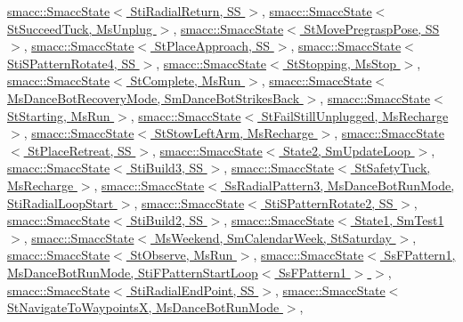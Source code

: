 \hyperlink{classsmacc_1_1SmaccState_afc39f8e0ca4001b2159a100da2fccd0e}{smacc\+::\+Smacc\+State$<$ Sti\+Radial\+Return, S\+S $>$}, \hyperlink{classsmacc_1_1SmaccState_afc39f8e0ca4001b2159a100da2fccd0e}{smacc\+::\+Smacc\+State$<$ St\+Succeed\+Tuck, Ms\+Unplug $>$}, \hyperlink{classsmacc_1_1SmaccState_afc39f8e0ca4001b2159a100da2fccd0e}{smacc\+::\+Smacc\+State$<$ St\+Move\+Pregrasp\+Pose, S\+S $>$}, \hyperlink{classsmacc_1_1SmaccState_afc39f8e0ca4001b2159a100da2fccd0e}{smacc\+::\+Smacc\+State$<$ St\+Place\+Approach, S\+S $>$}, \hyperlink{classsmacc_1_1SmaccState_afc39f8e0ca4001b2159a100da2fccd0e}{smacc\+::\+Smacc\+State$<$ Sti\+S\+Pattern\+Rotate4, S\+S $>$}, \hyperlink{classsmacc_1_1SmaccState_afc39f8e0ca4001b2159a100da2fccd0e}{smacc\+::\+Smacc\+State$<$ St\+Stopping, Ms\+Stop $>$}, \hyperlink{classsmacc_1_1SmaccState_afc39f8e0ca4001b2159a100da2fccd0e}{smacc\+::\+Smacc\+State$<$ St\+Complete, Ms\+Run $>$}, \hyperlink{classsmacc_1_1SmaccState_afc39f8e0ca4001b2159a100da2fccd0e}{smacc\+::\+Smacc\+State$<$ Ms\+Dance\+Bot\+Recovery\+Mode, Sm\+Dance\+Bot\+Strikes\+Back $>$}, \hyperlink{classsmacc_1_1SmaccState_afc39f8e0ca4001b2159a100da2fccd0e}{smacc\+::\+Smacc\+State$<$ St\+Starting, Ms\+Run $>$}, \hyperlink{classsmacc_1_1SmaccState_afc39f8e0ca4001b2159a100da2fccd0e}{smacc\+::\+Smacc\+State$<$ St\+Fail\+Still\+Unplugged, Ms\+Recharge $>$}, \hyperlink{classsmacc_1_1SmaccState_afc39f8e0ca4001b2159a100da2fccd0e}{smacc\+::\+Smacc\+State$<$ St\+Stow\+Left\+Arm, Ms\+Recharge $>$}, \hyperlink{classsmacc_1_1SmaccState_afc39f8e0ca4001b2159a100da2fccd0e}{smacc\+::\+Smacc\+State$<$ St\+Place\+Retreat, S\+S $>$}, \hyperlink{classsmacc_1_1SmaccState_afc39f8e0ca4001b2159a100da2fccd0e}{smacc\+::\+Smacc\+State$<$ State2, Sm\+Update\+Loop $>$}, \hyperlink{classsmacc_1_1SmaccState_afc39f8e0ca4001b2159a100da2fccd0e}{smacc\+::\+Smacc\+State$<$ Sti\+Build3, S\+S $>$}, \hyperlink{classsmacc_1_1SmaccState_afc39f8e0ca4001b2159a100da2fccd0e}{smacc\+::\+Smacc\+State$<$ St\+Safety\+Tuck, Ms\+Recharge $>$}, \hyperlink{classsmacc_1_1SmaccState_afc39f8e0ca4001b2159a100da2fccd0e}{smacc\+::\+Smacc\+State$<$ Ss\+Radial\+Pattern3, Ms\+Dance\+Bot\+Run\+Mode, Sti\+Radial\+Loop\+Start $>$}, \hyperlink{classsmacc_1_1SmaccState_afc39f8e0ca4001b2159a100da2fccd0e}{smacc\+::\+Smacc\+State$<$ Sti\+S\+Pattern\+Rotate2, S\+S $>$}, \hyperlink{classsmacc_1_1SmaccState_afc39f8e0ca4001b2159a100da2fccd0e}{smacc\+::\+Smacc\+State$<$ Sti\+Build2, S\+S $>$}, \hyperlink{classsmacc_1_1SmaccState_afc39f8e0ca4001b2159a100da2fccd0e}{smacc\+::\+Smacc\+State$<$ State1, Sm\+Test1 $>$}, \hyperlink{classsmacc_1_1SmaccState_afc39f8e0ca4001b2159a100da2fccd0e}{smacc\+::\+Smacc\+State$<$ Ms\+Weekend, Sm\+Calendar\+Week, St\+Saturday $>$}, \hyperlink{classsmacc_1_1SmaccState_afc39f8e0ca4001b2159a100da2fccd0e}{smacc\+::\+Smacc\+State$<$ St\+Observe, Ms\+Run $>$}, \hyperlink{classsmacc_1_1SmaccState_afc39f8e0ca4001b2159a100da2fccd0e}{smacc\+::\+Smacc\+State$<$ Ss\+F\+Pattern1, Ms\+Dance\+Bot\+Run\+Mode, Sti\+F\+Pattern\+Start\+Loop$<$ Ss\+F\+Pattern1 $>$ $>$}, \hyperlink{classsmacc_1_1SmaccState_afc39f8e0ca4001b2159a100da2fccd0e}{smacc\+::\+Smacc\+State$<$ Sti\+Radial\+End\+Point, S\+S $>$}, \hyperlink{classsmacc_1_1SmaccState_afc39f8e0ca4001b2159a100da2fccd0e}{smacc\+::\+Smacc\+State$<$ St\+Navigate\+To\+Waypoints\+X, Ms\+Dance\+Bot\+Run\+Mode $>$}, 